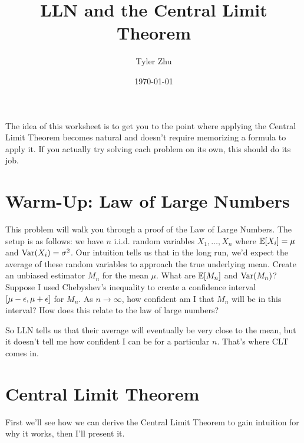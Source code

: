 \documentclass[11 pt]{scrartcl}
\newcommand{\hwtitle}{LLN and the Central Limit Theorem}
\begin{document}
 
\title{\Large \hwtitle{}}
\author{\large Tyler Zhu}
\date{\large\today}

\maketitle 

The idea of this worksheet is to get you to the point where applying the Central Limit Theorem becomes natural and doesn't require memorizing a formula to apply it. If you actually try solving each problem on its own, this should do its job. 

\section{Warm-Up: Law of Large Numbers}

\begin{problem}
    This problem will walk you through a proof of the Law of Large Numbers. The setup is as follows: we have $n$ i.i.d. random variables $X_1, \dots, X_n$ where $\mathbb E[X_i] = \mu$ and $\text{Var}(X_i) = \sigma^2$. Our intuition tells us that in the long run, we'd expect the average of these random variables to approach the true underlying mean. 
    \alphanum
        \ii Create an unbiased estimator $M_n$ for the mean $\mu$.
        \ii What are $\mathbb E[M_n]$ and $\text{Var}(M_n)$? 
        \ii Suppose I used Chebyshev's inequality to create a confidence interval $[\mu-\epsilon, \mu+\epsilon]$ for $M_n$. As $n\to\infty$, how confident am I that $M_n$ will be in this interval? How does this relate to the law of large numbers?
    \enumend
\end{problem}

So LLN tells us that their average will eventually be very close to the mean, but it doesn't tell me how confident I can be for a particular $n$. That's where CLT comes in. 

\section{Central Limit Theorem}
First we'll see how we can derive the Central Limit Theorem to gain intuition for why it works, then I'll present it. 
\end{document}
